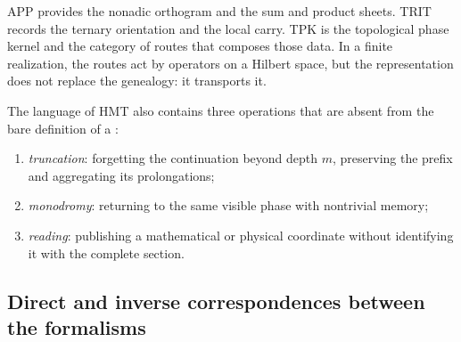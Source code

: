 APP provides the nonadic orthogram and the sum and product sheets. TRIT
records the ternary orientation and the local carry. TPK is the topological
phase kernel and the category of routes that composes those data. In a
finite realization, the routes act by operators on a Hilbert space,
but the representation does not replace the genealogy: it transports it.

The language of HMT also contains three operations that are absent from
the bare definition of a \QMS:

\begin{enumerate}
  \item \emph{truncation}: forgetting the continuation beyond depth
  $m$, preserving the prefix and aggregating its prolongations;
  \item \emph{monodromy}: returning to the same visible phase with nontrivial
  memory;
  \item \emph{reading}: publishing a mathematical or physical coordinate without
  identifying it with the complete section.
\end{enumerate}

\Needspace{.74\textheight}
\subsection{Direct and inverse correspondences between the formalisms}

